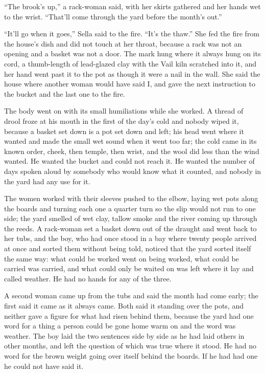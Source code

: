“The brook's up,” a rack-woman said, with her skirts gathered and her hands wet to the wrist. “That'll come through the yard before the month's out.”

“It'll go when it goes,” Sella said to the fire. “It's the thaw.” She fed the fire from the house's dish and did not touch  at her throat, because a rack was not an opening and a basket was not a door. The mark hung where it always hung on its cord, a thumb-length of lead-glazed clay with the Vail kiln scratched into it, and her hand went past it to the pot as though it were a nail in the wall. She said the house where another woman would have said I, and gave the next instruction to the bucket and the last one to the fire.

The body went on with its small humiliations while she worked. A thread of drool froze at his mouth in the first of the day's cold and nobody wiped it, because a basket set down is a pot set down and left; his head went where it wanted and made the small wet sound when it went too far; the cold came in its known order, cheek, then temple, then wrist, and the wool did less than the wind wanted. He wanted the bucket and could not reach it. He wanted the number of days spoken aloud by somebody who would know what it counted, and nobody in the yard had any use for it.

The women worked with their sleeves pushed to the elbow, laying wet pots along the boards and turning each one a quarter turn so the slip would not run to one side; the yard smelled of wet clay, tallow smoke and the river coming up through the reeds. A rack-woman set a basket down out of the draught and went back to her tubs, and the boy, who had once stood in a bay where twenty people arrived at once and sorted them without being told, noticed that the yard sorted itself the same way: what could be worked went on being worked, what could be carried was carried, and what could only be waited on was left where it lay and called weather. He had no hands for any of the three.

A second woman came up from the tubs and said the month had come early; the first said it came as it always came. Both said it standing over the pots, and neither gave a figure for what had risen behind them, because the yard had one word for a thing a person could be gone home warm on and the word was weather. The boy laid the two sentences side by side as he had laid others in other months, and left the question of which was true where it stood. He had no  word for the brown weight going over itself behind the boards. If he had had one he could not have said it.

